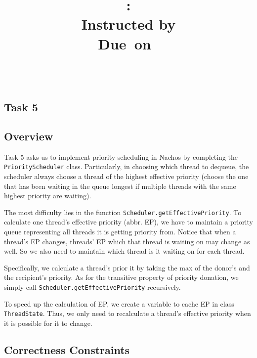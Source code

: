 \documentclass{article}
\title{\textmd{\bf \Class: \Title}\\{\large Instructed by \textit{\ClassInstructor}}\\\normalsize\vspace{0.1in}\small{Due\ on\ \DueDate}}
\date{}
\author{\textbf{\StudentName}\ \ \StudentClass\ \ \StudentNumber}
\begin{document}
\begin{spacing}{1.1}
\maketitle \thispagestyle{empty}



\theoremstyle{plain} \newtheorem{computational}{Definition}

\section{Task 5}

\subsection{Overview}
Task 5 asks us to implement priority scheduling in Nachos by completing the \texttt{PriorityScheduler} class. Particularly, in choosing which  thread to dequeue, the scheduler always choose a thread of the highest effective priority (choose the one that has been waiting in the queue longest if multiple threads with the same highest priority are waiting).

The most difficulty lies in the function \texttt{Scheduler.getEffectivePriority}. To calculate one thread's effective priority (abbr. EP), we have to maintain a priority queue representing all threads it is getting priority from. Notice that when a thread's EP changes, threads' EP which that thread is waiting on may change as well. So we also need to maintain which thread is it waiting on for each thread. 

Specifically, we calculate a thread's prior it  by taking the max of the donor's and the recipient's priority. As for the transitive property of priority donation, we simply call \texttt{Scheduler.getEffectivePriority} recursively.

To speed up the calculation of EP, we create a variable to cache EP in class \texttt{ThreadState}. Thus, we only need to recalculate a thread's effective priority when it is possible for it to change.

\subsection{Correctness Constraints}


\end{spacing}
\end{document}
